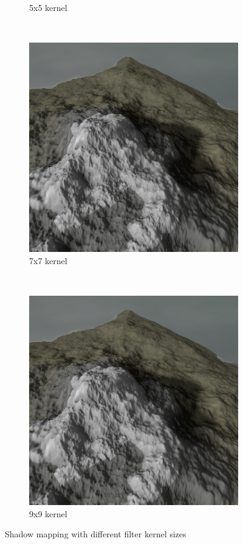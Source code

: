 \documentclass{article}
\begin{document}
\begin{figure}[H]
\begin{subfigure}[b]{0.45\textwidth}
        \caption{5x5 kernel}
        \label{fig:shadowFilter2}
    \end{subfigure}
    ~
    \begin{subfigure}[b]{0.45\textwidth}
        \centering
        \includegraphics[scale=0.25]{shadowFilter3}
        \caption{7x7 kernel}
        \label{fig:shadowFilter3}
    \end{subfigure}
    ~
    \begin{subfigure}[b]{0.45\textwidth}
        \centering
        \includegraphics[scale=0.25]{shadowFilter4}
        \caption{9x9 kernel}
        \label{fig:shadowFilter4}
    \end{subfigure}
    \caption{Shadow mapping with different filter kernel sizes}
    \label{fig:shadowMapFilter}
\end{figure}
\end{document}
